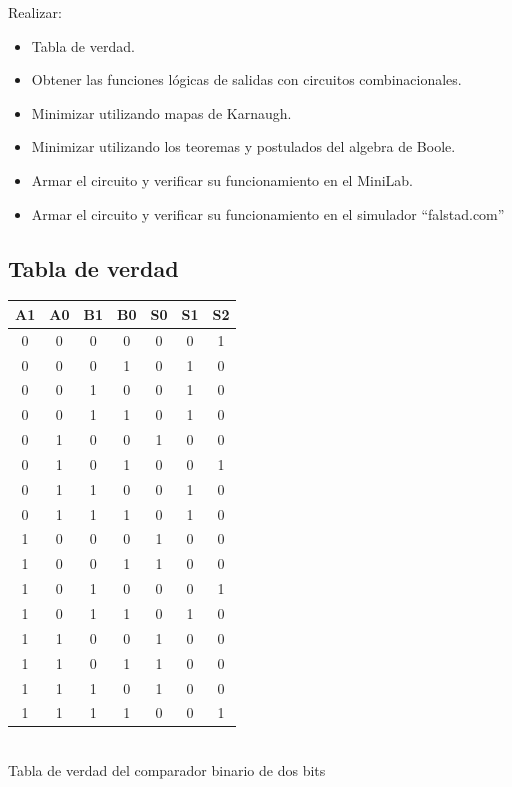 Realizar:
\begin{itemize}
 \item Tabla de verdad.
 \item Obtener las funciones lógicas de salidas con circuitos combinacionales.
 \item Minimizar utilizando mapas de Karnaugh.
 \item Minimizar utilizando los teoremas y postulados del algebra de Boole.
 \item Armar el circuito y verificar su funcionamiento en el MiniLab.
 \item Armar el circuito y verificar su funcionamiento en el simulador “falstad.com”
\end{itemize}



\subsection{Tabla de verdad}

\begin{center}
\centering
\begin{tabular}{c c c c || c c c}
A1 & A0 & B1 & B0 & S0 & S1 & S2 \\
\hline
0 & 0 & 0 & 0 & 0 & 0 & 1 \\
0 & 0 & 0 & 1 & 0 & 1 & 0 \\
0 & 0 & 1 & 0 & 0 & 1 & 0 \\
0 & 0 & 1 & 1 & 0 & 1 & 0 \\
0 & 1 & 0 & 0 & 1 & 0 & 0 \\
0 & 1 & 0 & 1 & 0 & 0 & 1 \\
0 & 1 & 1 & 0 & 0 & 1 & 0 \\
0 & 1 & 1 & 1 & 0 & 1 & 0 \\
1 & 0 & 0 & 0 & 1 & 0 & 0 \\
1 & 0 & 0 & 1 & 1 & 0 & 0 \\
1 & 0 & 1 & 0 & 0 & 0 & 1 \\
1 & 0 & 1 & 1 & 0 & 1 & 0 \\
1 & 1 & 0 & 0 & 1 & 0 & 0 \\
1 & 1 & 0 & 1 & 1 & 0 & 0 \\
1 & 1 & 1 & 0 & 1 & 0 & 0 \\
1 & 1 & 1 & 1 & 0 & 0 & 1 \\
\end{tabular}
\\Tabla de verdad del comparador binario de dos bits
\end{center}


